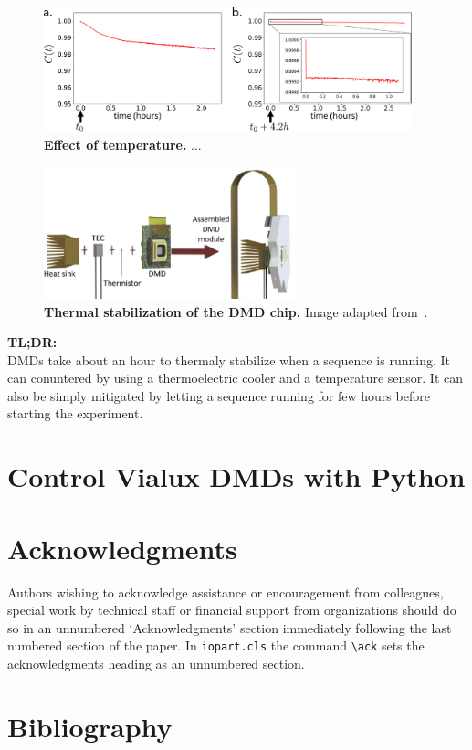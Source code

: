 \documentclass[12pt]{iopart}
\begin{document}
\begin{figure}[ht]
  \centering
  \includegraphics[width = 0.95\textwidth]{images/DMD_decorrelation_T.pdf}
  \caption{
  \textbf{Effect of temperature.}
    ...
  }
  \label{fig:Cizmar_1}
\end{figure}



\begin{figure}
  \centering
  \includegraphics[width = 0.65\textwidth]{images/Cizmar_1.pdf}
  \caption{
  \textbf{Thermal stabilization of the DMD chip.}
    Image adapted from~\cite{Rudolf2021thermal}.
  }
  \label{fig:decorr_T}
\end{figure}

\begin{tldr}
\textbf{TL;DR:}\\
DMDs take about an hour to thermaly stabilize when a sequence is running. 
It can conuntered by using a thermoelectric cooler 
and a temperature sensor. 
It can also be simply mitigated by letting a sequence running for few hours
before starting the experiment. 
\end{tldr}

\section{Control Vialux DMDs with Python}

\cite{hofling2004alp}

\cite{popoff2016alp4lib}

\section{Acknowledgments}
Authors wishing to acknowledge assistance or encouragement from 
colleagues, special work by technical staff or financial support from 
organizations should do so in an unnumbered `Acknowledgments' section 
immediately following the last numbered section of the paper. In \verb"iopart.cls" the 
command \verb"\ack" sets the acknowledgments heading as an unnumbered
section.

\section{Bibliography}




\end{document}
